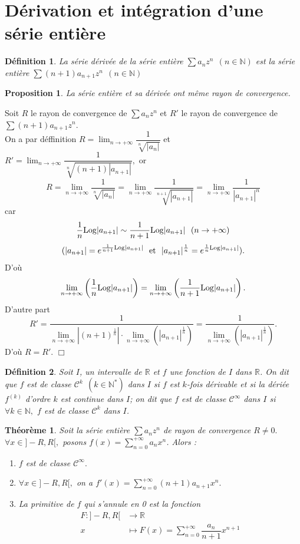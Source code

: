 \documentclass[11pt, a4paper]{book}
\newtheorem{teo}{Th\'eor\`eme}[section]
\newtheorem{defi}{D\'efinition}[section]
\newtheorem{pro}{Proposition}[section]
\newenvironment{pr}{\noindent {\bf Preuve} \noindent} {\hfill $\Box$\vskip 5mm}
\begin{document}
\section{D\'erivation et int\'egration d'une s\'erie enti\`ere }
\begin{defi}
La s\'erie d\'eriv\'ee de la s\'erie enti\`ere $\sum a_nz^n~~(n\in \mathbb{N})$ est la s\'erie enti\`ere $\sum(n+1)a_{n+1}z^n~~(n\in\mathbb{N})$
\end{defi}
\begin{pro} \label{pro5.4.1} La s\'erie enti\`ere et sa d\'eriv\'ee ont m\^eme rayon de convergence. 
\end{pro}
\begin{pr}\quad
Soit $R$ le rayon de convergence de $\sum a_nz^n$ et $R'$ le rayon de convergence de $\sum (n+1)a_{n+1}z^n.$\\
 On a par d\'effinition ${\displaystyle R=\lim_{n\rightarrow+\infty}\dfrac{1}{\sqrt[n]{|a_n|}}}$ et ${\displaystyle R'=\lim_{n\rightarrow+\infty}\dfrac{1}{\sqrt[n]{(n+1)|a_{n+1}|}},}$ 
or $$R=\lim_{n\rightarrow+\infty}\dfrac{1}{\sqrt[n]{|a_n|}}=\lim_{n\rightarrow+\infty}\dfrac{1}{\sqrt[n+1]{|a_{n+1}|}}=\lim_{n\rightarrow+\infty}\dfrac{1}{|a_{n+1}|^{n}}$$ car $$\dfrac{1}{n}\mathrm{Log}|a_{n+1}|\sim\dfrac{1}{n+1}\mathrm{Log}|a_{n+1}|~~(n\rightarrow+\infty)$$ $$(|a_{n+1}|=e^{\frac{1}{n+1}\mathrm{Log} |a_{n+1}|}~~\text{et}~~|a_{n+1}|^\frac{1}{n}=e^{\frac{1}{n}\mathrm{Log}|a_{n+1}|}).$$
D'o\`u $$\lim_{n\rightarrow+\infty}\left(\dfrac{1}{n}\mathrm{Log}|a_{n+1}|\right)=\lim_{n\rightarrow+\infty}\left(\dfrac{1}{n+1}\mathrm{Log}|a_{n+1}|\right).$$ D'autre part $$R'=\dfrac{1}{{\displaystyle\lim_{n\rightarrow+\infty}|(n+1)^\frac{1}{n}|\cdot\lim_{n\rightarrow+\infty}(|a_{n+1}|^\frac{1}{n})}}=\dfrac{1}{{\displaystyle \lim_{n\rightarrow+\infty}(|a_{n+1}|^\frac{1}{n})}}.$$ D'o\`u $R=R'.$
\end{pr}
\begin{defi} Soit $I$, un intervalle de $\mathbb{R}$ et $f$ une fonction de $I$ dans $\mathbb{R}$. On dit que $f$ est de classe $\mathcal{C}^k~~(k\in \mathbb{N}^*)$ dans $I$ si $f$ est $k$-fois d\'erivable et si la d\'eri\'ee $f^{(k)}$ d'ordre $k$ est continue dans $I$; on dit que $f$ est de classe $\mathcal{C}^\infty$ dans $I$ si $\forall k\in \mathbb{N},$ $f$ est de classe $\mathcal{C}^k$ dans $I$. 
\end{defi}
\begin{teo}\label{teo5.4.1} Soit la s\'erie enti\`ere $\sum a_nz^n$ de rayon de convergence $R\neq0.$ $\forall x\in ]-R,R[,$ posons ${\displaystyle f(x)=\sum_{n=0}^{+\infty}a_nx^n}$. Alors :
\begin{enumerate}
\item $f$ est de classe $\mathcal{C}^\infty.$ 
\item $\forall x\in ]-R,R[,$ on a ${\displaystyle f'(x)=\sum_{n=0}^{+\infty}(n+1)a_{n+1}x^n.}$
\item La primitive de $f$ qui s'annule en 0 est la fonction \begin{align*}
F:]-R,R[&\longrightarrow\mathbb{R}\\ x&\longmapsto F(x)=\sum_{n=0}^{+\infty}\dfrac{a_n}{n+1}x^{n+1}
\end{align*}
\end{enumerate} 
\end{teo}
\end{document}
